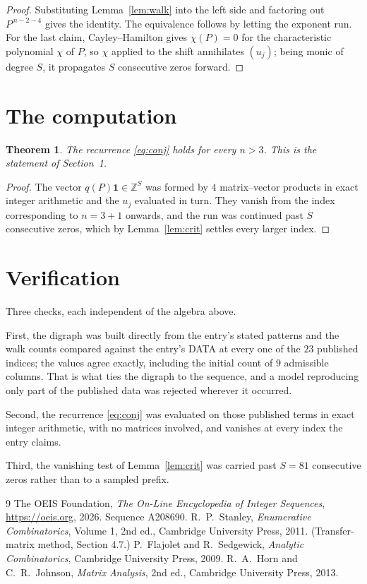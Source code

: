 \documentclass[11pt,a4paper]{article}
\theoremstyle{plain}
\newtheorem{theorem}{Theorem}
\theoremstyle{definition}
\begin{document}
\begin{proof}
Substituting Lemma~\ref{lem:walk} into the left side and factoring out
$P^{\,n-2-4}$ gives the identity. The equivalence follows by letting the exponent
run. For the last claim, Cayley--Hamilton gives $\chi(P)=0$ for the characteristic
polynomial $\chi$ of $P$, so $\chi$ applied to the shift annihilates $(u_j)$; being monic of
degree $S$, it propagates $S$ consecutive zeros forward.
\end{proof}

\section{The computation}

\begin{theorem}
The recurrence \eqref{eq:conj} holds for every $n>3$. This is the statement of
Section~1.
\end{theorem}

\begin{proof}
The vector $q(P)\mathbf{1}\in\mathbb{Z}^{S}$ was formed by $4$ matrix--vector
products in exact integer arithmetic and the $u_j$ evaluated in turn. They vanish from the
index corresponding to $n=3+1$ onwards, and the run was continued past $S$ consecutive
zeros, which by Lemma~\ref{lem:crit} settles every larger index.
\end{proof}

\section{Verification}

Three checks, each independent of the algebra above.

First, the digraph was built directly from the entry's stated patterns and the walk counts
compared against the entry's DATA at every one of the $23$ published indices; the
values agree exactly, including the initial count of $9$ admissible columns. That is
what ties the digraph to the sequence, and a model reproducing only part of the published
data was rejected wherever it occurred.

Second, the recurrence \eqref{eq:conj} was evaluated on those published terms in exact
integer arithmetic, with no matrices involved, and vanishes at every index the entry claims.

Third, the vanishing test of Lemma~\ref{lem:crit} was carried past $S=81$ consecutive
zeros rather than to a sampled prefix.

\begin{thebibliography}{9}
 The OEIS Foundation, \emph{The On-Line Encyclopedia of Integer
Sequences}, \url{https://oeis.org}, 2026. Sequence A208690.
 R.~P.~Stanley, \emph{Enumerative Combinatorics}, Volume 1, 2nd ed.,
Cambridge University Press, 2011. (Transfer-matrix method, Section 4.7.)
 P.~Flajolet and R.~Sedgewick, \emph{Analytic Combinatorics}, Cambridge
University Press, 2009.
 R.~A.~Horn and C.~R.~Johnson, \emph{Matrix Analysis}, 2nd ed., Cambridge
University Press, 2013.
\end{thebibliography}
\end{document}
